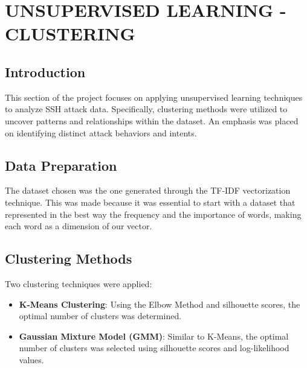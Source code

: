 

\section{UNSUPERVISED LEARNING - CLUSTERING}


    \subsection*{Introduction}
    
        This section of the project focuses on applying unsupervised learning techniques to analyze SSH attack data. Specifically, clustering methods were utilized to uncover patterns and relationships within the dataset. An emphasis was placed on identifying distinct attack behaviors and intents.

    \subsection*{Data Preparation}
    
        The dataset chosen was the one generated through the TF-IDF vectorization technique. This was made because it was essential to start with a dataset that represented in the best way the frequency and the importance of words, making each word as a dimension of our vector.

    \subsection*{Clustering Methods}
    
        Two clustering techniques were applied:
        
        \begin{itemize}
        
            \item \textbf{K-Means Clustering}: Using the Elbow Method and silhouette scores, the optimal number of clusters was determined.
            
            \item \textbf{Gaussian Mixture Model (GMM)}: Similar to K-Means, the optimal number of clusters was selected using silhouette scores and log-likelihood values.
            
        \end{itemize}

